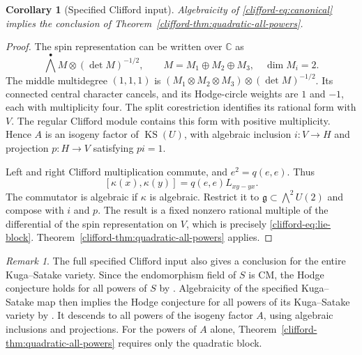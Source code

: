 \documentclass[11pt]{article}
\newtheorem{corollary}[theorem]{Corollary}
\theoremstyle{definition}
\theoremstyle{remark}
\newtheorem{remark}[theorem]{Remark}
\begin{document}
\begin{corollary}[Specified Clifford input]\label{clifford-cor:canonical-all-powers}
Algebraicity of \eqref{clifford-eq:canonical} implies the conclusion of
Theorem~\ref{clifford-thm:quadratic-all-powers}.
\end{corollary}
\begin{proof}
The spin representation can be written over $\mathbb C$ as
\[
 \bigwedge^\bullet M\otimes(\det M)^{-1/2},
 \qquad M=M_1\oplus M_2\oplus M_3,\quad\dim M_i=2.
\]
The middle multidegree $(1,1,1)$ is
$(M_1\otimes M_2\otimes M_3)\otimes(\det M)^{-1/2}$.
Its connected central character cancels, and its Hodge-circle weights
are $1$ and $-1$, each with multiplicity four.  The split corestriction
identifies its rational form with $V$.  The regular Clifford module
contains this form with positive multiplicity.  Hence $A$ is an isogeny
factor of $\operatorname{KS}(U)$, with algebraic inclusion $i:V\to H$
and projection $p:H\to V$ satisfying $pi=1$.

Left and right Clifford multiplication commute, and $e^2=q(e,e)$.
Thus
\[
 [\kappa(x),\kappa(y)]=q(e,e)L_{xy-yx}.
\]
The commutator is algebraic if $\kappa$ is algebraic.  Restrict it to
$\mathfrak g\subset\bigwedge^2U(2)$ and compose with $i$ and $p$.
The result is a fixed nonzero rational multiple of the differential of
the spin representation on $V$, which is precisely
\eqref{clifford-eq:lie-block}.  Theorem~\ref{clifford-thm:quadratic-all-powers} applies.
\end{proof}

\begin{remark}\label{clifford-rem:all-powers}
The full specified Clifford input also gives a conclusion for the entire
Kuga--Satake variety.  Since the endomorphism field of $S$ is CM, the Hodge conjecture holds for all powers of $S$
by \cite[Corollary~2.3]{clifford-Varesco}.  Algebraicity of the specified
Kuga--Satake map then implies the Hodge conjecture for all powers of its
Kuga--Satake variety by \cite[Theorem~3.5 and Remark~3.4]{clifford-Floccari}.
It descends to all powers of the isogeny factor $A$, using algebraic
inclusions and projections.  For the powers of $A$ alone,
Theorem~\ref{clifford-thm:quadratic-all-powers} requires only the
quadratic block.
\end{remark}
\end{document}
